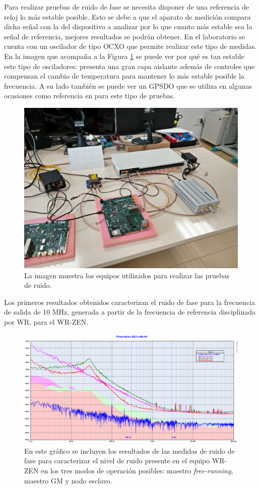 Para realizar pruebas de ruido de fase se necesita disponer de una referencia 
de reloj lo más estable posible. Esto se debe a que el aparato de medición 
compara dicha señal con la del dispositivo a analizar por lo que cuanto más 
estable sea la señal de referencia, mejores resultados se podrán obtener. En el 
laboratorio se cuenta con un oscilador de tipo OCXO que permite realizar este 
tipo de medidas. En la imagen que acompaña a la Figura \ref{fig:medidapn} se 
puede ver por qué es tan estable este tipo de osciladores: presenta una gran 
capa aislante además de controles que compensan el cambio de temperatura para 
mantener lo más estable posible la frecuencia. A su lado también se puede ver 
un GPSDO que se utiliza en algunas ocasiones como referencia en para este tipo 
de pruebas.

\begin{figure}
	\centering
	\includegraphics[width=0.7\linewidth]{imagenes/medida_pn}
	\caption[Imagen de la toma de medidas de \textit{Phase Noise}]{La imagen 
	muestra los equipos utilizados para realizar las pruebas de ruido.}
	\label{fig:medidapn}
\end{figure}

Los primeros resultados obtenidos caracterizan el ruido de fase para la 
frecuencia de salida de 10 MHz, generada a partir de la frecuencia de 
referencia disciplinada por WR, para el WR-ZEN. 

\begin{figure}
	\centering
	\includegraphics[width=\linewidth]{imagenes/wrzenpn}
	\caption[Gráfico de ruido de fase para el WR-ZEN]{En este gráfico se 
	incluyen los resultados de las medidas de ruido de fase para caracterizar 
	el nivel de ruido presente en el equipo WR-ZEN en los tres modos de 
	operación posibles: maestro \textit{free-running}, maestro GM y nodo 
	esclavo.}
	\label{fig:wrzenpn}
\end{figure}

